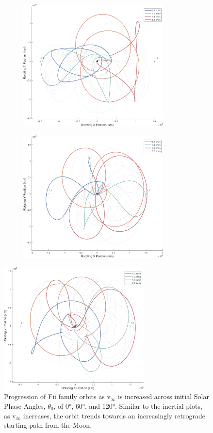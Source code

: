 \documentclass[letterpaper, paper,11pt]{AAS}	%
\begin{document}
\begin{figure}[h!]
    \begin{subfigure}{}
        \includegraphics[trim=75 50 0 0, clip, width=3in]{./figs/sunrot_vInfPlot_ii_famF_theta0.png}
    \end{subfigure}
    \begin{subfigure}{}
        \includegraphics[trim=75 50 0 0, clip, width=3in]{./figs/sunrot_vInfPlot_ii_famF_theta60.png}
    \end{subfigure}
\end{figure}
\begin{figure}[h]
    \centering
    \includegraphics[trim=75 50 0 0, clip, width=3in]{./figs/sunrot_vInfPlot_ii_famF_theta120.png}
    \caption{Progression of Fii family orbits as v\(_\infty\) is increased across initial Solar Phase Angles, \(\theta_0\), of 0°, 60°, and 120°. Similar to the inertial plots, as v\(_\infty\) increases, the orbit trends towards an increasingly retrograde starting path from the Moon.}
    \label{fig:sunrot_vinfPlot_ii_F}
\end{figure}
\end{document}
